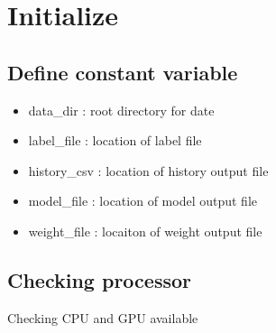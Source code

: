 \documentclass[11pt]{article}
\providecommand{\tightlist}{%
      \setlength{\itemsep}{0pt}\setlength{\parskip}{0pt}}
\begin{document}
    
    
    
    
    
    
    \hypertarget{initialize}{%
\section{Initialize}\label{initialize}}

\hypertarget{define-constant-variable}{%
\subsection{Define constant variable}\label{define-constant-variable}}

\begin{itemize}
\tightlist
\item
  data\_dir : root directory for date
\item
  label\_file : location of label file
\item
  history\_csv : location of history output file
\item
  model\_file : location of model output file
\item
  weight\_file : locaiton of weight output file
\end{itemize}

\hypertarget{checking-processor}{%
\subsection{Checking processor}\label{checking-processor}}

Checking CPU and GPU available
\end{document}
